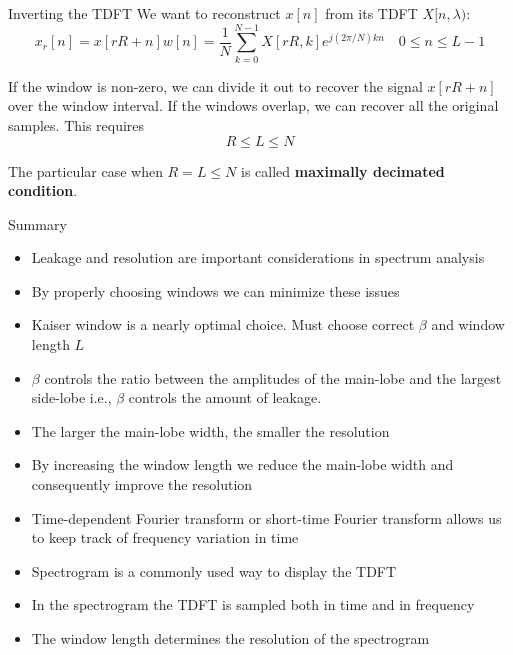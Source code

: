\documentclass[10pt, aspectratio=169, handout]{beamer}
\begin{document}
\begin{frame}{Inverting the TDFT}
We want to reconstruct $x[n]$ from its TDFT $X[n, \lambda)$:
\begin{equation*}
	x_r[n] = x[rR+n]w[n] = \frac{1}{N}\sum_{k = 0}^{N-1}X[rR, k]e^{j(2\pi/N)kn} \quad 0 \leq n \leq L-1
\end{equation*}

If the window is non-zero, we can divide it out to recover the signal $x[rR+n]$ over the window interval. If the windows overlap, we can recover all the original samples. This requires
\begin{equation*}
	R \leq L \leq N
\end{equation*}

The particular case when $R = L \leq N$ is called \textbf{maximally decimated condition}.

\end{frame}

\begin{frame}{Summary}
\begin{itemize}
	\item Leakage and resolution are important considerations in spectrum analysis
	\item By properly choosing windows we can minimize these issues
	\item Kaiser window is a nearly optimal choice. Must choose correct $\beta$ and window length $L$
	\item $\beta$ controls the ratio between the amplitudes of the main-lobe and the largest side-lobe i.e., $\beta$ controls the amount of leakage.
	\item The larger the main-lobe width, the smaller the resolution
	\item By increasing the window length we reduce the main-lobe width and consequently improve the resolution
	\item Time-dependent Fourier transform or short-time Fourier transform allows us to keep track of frequency variation in time
	\item Spectrogram is a commonly used way to display the TDFT
	\item In the spectrogram the TDFT is sampled both in time and in frequency
	\item The window length determines the resolution of the spectrogram
\end{itemize}
\end{frame}
\end{document}
